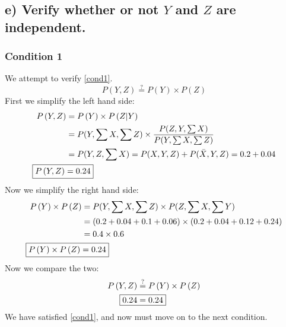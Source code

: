\documentclass[12pt,letterpaper]{article}
\begin{document}
\subsection{e) Verify whether or not $Y$ and $Z$ are independent.}
\subsubsection*{Condition 1}
We attempt to verify \eqref{cond1}.
\begin{equation*}
P\left(Y,Z\right)\stackrel{?}{=}P\left(Y\right)\times P\left(Z\right)
\end{equation*}
First we simplify the left hand side:
\begin{align*}
P\left(Y,Z\right) &= P\left(Y\right) \times P\left(Z\middle|Y\right)\\
&= P(Y,\sum{X},\sum{Z}) \times\frac{P(Z,Y,\sum{X})}{P(Y,\sum{X},\sum{Z})}\\
&= P(Y,Z,\sum{X}) = P(X,Y,Z) + P(\bar{X},Y,Z) = 0.2+0.04\\
\Aboxed{P\left(Y,Z\right) &= 0.24}
%
\end{align*}
Now we simplify the right hand side:
\begin{align*}
P\left(Y\right) \times P\left(Z\right) &= P(Y,\sum{X},\sum{Z}) \times P(Z,\sum{X},\sum{Y})\\
&= \left(0.2+0.04+0.1+0.06\right) \times \left(0.2+0.04+0.12+0.24\right)\\
&= 0.4 \times 0.6\\
\Aboxed{P\left(Y\right) \times P\left(Z\right) &= 0.24}
%
\end{align*}
Now we compare the two:
\begin{align*}
P\left(Y,Z\right)&\stackrel{?}{=}P\left(Y\right)\times P\left(Z\right)\\
\Aboxed{0.24 &= 0.24}
\end{align*}
We have satisfied \eqref{cond1}, and now must move on to the next condition.
\end{document}
